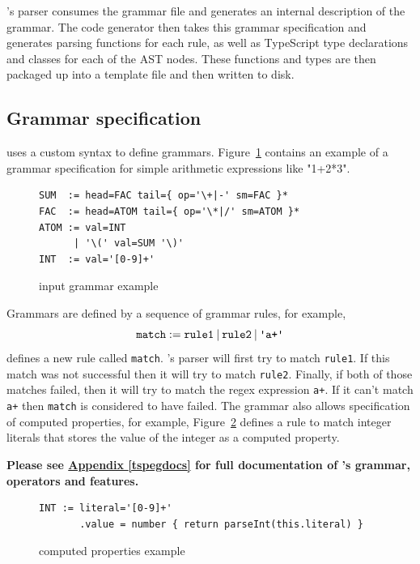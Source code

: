 \tsPEG{}'s parser consumes the grammar file and generates an internal description of the grammar. The code generator then takes this grammar specification and generates parsing functions for each rule, as well as TypeScript type declarations and classes for each of the AST nodes. These functions and types are then packaged up into a template file and then written to disk.

\subsection{Grammar specification}

\tsPEG{} uses a custom syntax to define grammars. Figure~\ref{tspegexample} contains an example of a grammar specification for simple arithmetic expressions like "1+2*3".

\begin{figure}
    \caption{\tsPEG{} input grammar example}
    \label{tspegexample}
    \begin{lstlisting}[language=tspeg]
SUM  := head=FAC tail={ op='\+|-' sm=FAC }*
FAC  := head=ATOM tail={ op='\*|/' sm=ATOM }*
ATOM := val=INT
      | '\(' val=SUM '\)'
INT  := val='[0-9]+'
    \end{lstlisting}
\end{figure}

Grammars are defined by a sequence of grammar rules, for example,
    \[\texttt{match} := \texttt{rule1} \mathbin{|} \texttt{rule2} \mathbin{|} \texttt{\textquotesingle a+\textquotesingle}\]
defines a new rule called \verb|match|. \tsPEG{}'s parser will first try to match \verb|rule1|. If this match was not successful then it will try to match \verb|rule2|. Finally, if both of those matches failed, then it will try to match the regex expression \verb|a+|. If it can't match \verb|a+| then \verb|match| is considered to have failed.
    The \tsPEG{} grammar also allows specification of computed properties, for example, Figure~\ref{tspegcomputed} defines a rule to match integer literals that stores the value of the integer as a computed property.

   \textbf{Please see \hyperref[tspegdocs]{Appendix \ref*{tspegdocs}} for full documentation of \tsPEG{}'s grammar, operators and features.} 
\begin{figure}
    \caption{\tsPEG{} computed properties example}
    \label{tspegcomputed}
    \begin{lstlisting}[language=tspeg]
INT := literal='[0-9]+'
       .value = number { return parseInt(this.literal) }
    \end{lstlisting}
\end{figure}

